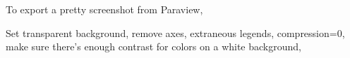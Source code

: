 





To export a pretty screenshot from Paraview,

Set transparent background, remove axes, extraneous legends, compression=0,
make sure there's enough contrast for colors on a white background,
